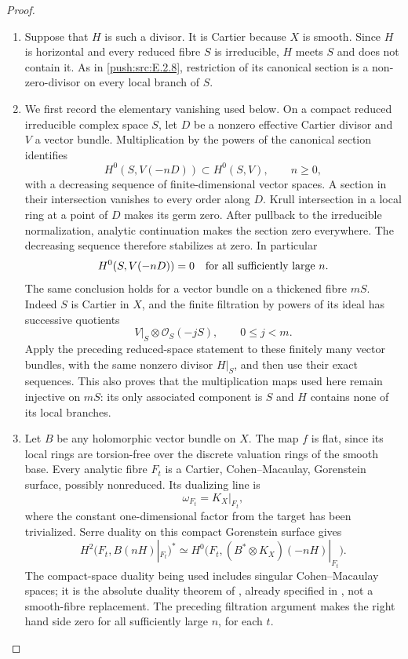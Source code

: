 \begin{proof}

\begin{enumerate}[label={$\langle1\rangle$\arabic*.},leftmargin=*]
\item Suppose that $H$ is such a divisor.  It is Cartier because
$X$ is smooth.  Since $H$ is horizontal and every reduced
fibre $S$ is irreducible, $H$ meets $S$ and does not contain
it.  As in \ref{push:src:E.2.8}, restriction of its canonical section is a
non-zero-divisor on every local branch of $S$.

\item We first record the elementary vanishing used below.  On a
compact reduced irreducible complex space $S$, let $D$ be a
nonzero effective Cartier divisor and $V$ a vector bundle.
Multiplication by the powers of the canonical section
identifies
\[
 H^0(S,V(-nD))\subset H^0(S,V),\qquad n\ge0,
\]
with a decreasing sequence of finite-dimensional vector
spaces.  A section in their intersection vanishes to every
order along $D$.  Krull intersection in a local ring at a
point of $D$ makes its germ zero.  After pullback to the
irreducible normalization, analytic continuation makes the
section zero everywhere.  The decreasing sequence therefore
stabilizes at zero.  In particular
\[
 H^0(S,V(-nD))=0\quad\hbox{for all sufficiently large }n.
\]
The same conclusion holds for a vector bundle on a thickened
fibre $mS$.  Indeed $S$ is Cartier in $X$, and the finite
filtration by powers of its ideal has successive quotients
\[
 V|_S\otimes\mathcal O_S(-jS),\qquad 0\le j<m.
\]
Apply the preceding reduced-space statement to these finitely
many vector bundles, with the same nonzero divisor $H|_S$,
and then use their exact sequences.  This also proves that
the multiplication maps used here remain injective on $mS$:
its only associated component is $S$ and $H$ contains none
of its local branches.

\item Let $B$ be any holomorphic vector bundle on $X$.  The map
$f$ is flat, since its local rings are torsion-free over the
discrete valuation rings of the smooth base.  Every analytic
fibre $F_t$ is a Cartier, Cohen--Macaulay, Gorenstein surface,
possibly nonreduced.  Its dualizing line is
\[
 \omega_{F_t}=K_X|_{F_t},
\]
where the constant one-dimensional factor from the target
has been trivialized.  Serre duality on this compact
Gorenstein surface gives
\[
 H^2(F_t,B(nH)|_{F_t})^*
 \simeq H^0\bigl(F_t,(B^*\otimes K_X)(-nH)|_{F_t}\bigr).
\]
The compact-space duality being used includes singular
Cohen--Macaulay spaces; it is the absolute duality theorem
of \citet[\S3, Theorem~1, p.~81, and the complete-intersection
calculation on p.~91]{RR70push}, already specified in ,
not a smooth-fibre replacement.
The preceding filtration argument makes the right hand
side zero for all sufficiently large $n$, for each $t$.


\end{enumerate}
\end{proof}
